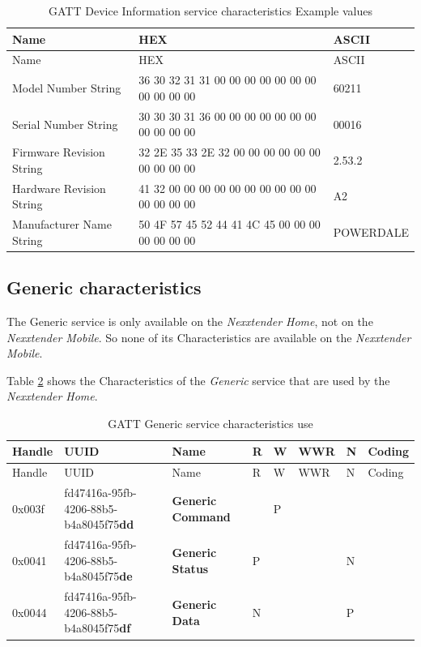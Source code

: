 \documentclass[a4paper]{article}
\begin{document}
\begin{longtable}[]{@{}lll@{}}
	\caption{GATT Device Information service characteristics Example values}
	\label{table.9}
	\tabularnewline
	\toprule\noalign{}
	Name                 & HEX                                             & ASCII \\
	\midrule\noalign{}
	\endfirsthead
	\toprule\noalign{}
	Name                 & HEX                                             & ASCII \\
	\midrule\noalign{}
	\endhead
	\bottomrule\noalign{}
	\endlastfoot
	Model Number String  & 36 30 32 31 31 00 00 00 00 00 00 00 00 00 00 00 &       
	60211 \\
	Serial Number String & 30 30 30 31 36 00 00 00 00 00 00 00 00 00 00 00 &       
	00016 \\
	Firmware Revision String & 32 2E 35 33 2E 32 00 00 00 00 00 00 00 00 00
	00 & 2.53.2 \\
	Hardware Revision String & 41 32 00 00 00 00 00 00 00 00 00 00 00 00 00
	00 & A2 \\
	Manufacturer Name String & 50 4F 57 45 52 44 41 4C 45 00 00 00 00 00 00
	00 & POWERDALE \\
\end{longtable}

\subsection{Generic characteristics}
\label{generic_characteristics}

The Generic service is only available on the \emph{Nexxtender Home}, 
not on the \emph{Nexxtender Mobile}. 
So none of its Characteristics are available on the \emph{Nexxtender Mobile}.

Table \ref{table.10} shows the Characteristics of the \emph{Generic} service that are used by
the \emph{Nexxtender Home}.

\begin{longtable}[]{@{}llllllll@{}}
	\caption{GATT Generic service characteristics use}
	\label{table.10}
	\tabularnewline
	\toprule\noalign{}
	Handle & UUID & Name & R & W & WWR & N & Coding \\
	\midrule\noalign{}
	\endfirsthead
	\toprule\noalign{}
	Handle & UUID & Name & R & W & WWR & N & Coding \\
	\midrule\noalign{}
	\endhead
	\bottomrule\noalign{}
	\endlastfoot
	0x003f & fd47416a-95fb-4206-88b5-b4a8045f75\textbf{dd} & \textbf{Generic
	Command} & & P & & & \\
	0x0041 & fd47416a-95fb-4206-88b5-b4a8045f75\textbf{de} & \textbf{Generic
	Status} & P & & & N & \\
	0x0044 & fd47416a-95fb-4206-88b5-b4a8045f75\textbf{df} & \textbf{Generic
	Data} & N & & & P & \\
\end{longtable}
\end{document}
